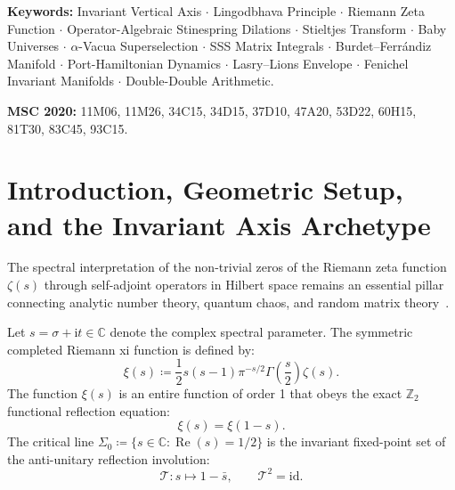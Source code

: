 \documentclass[11pt,a4paper,reqno]{article}
\theoremstyle{plain}
\theoremstyle{definition}
\theoremstyle{remark}
\numberwithin{equation}{section}
\begin{document}
\vspace{0.8ex}
\noindent\textbf{Keywords:} Invariant Vertical Axis $\cdot$ Lingodbhava Principle $\cdot$ Riemann Zeta Function $\cdot$ Operator-Algebraic Stinespring Dilations $\cdot$ Stieltjes Transform $\cdot$ Baby Universes $\cdot$ $\alpha$-Vacua Superselection $\cdot$ SSS Matrix Integrals $\cdot$ Burdet--Ferr\'{a}ndiz Manifold $\cdot$ Port-Hamiltonian Dynamics $\cdot$ Lasry--Lions Envelope $\cdot$ Fenichel Invariant Manifolds $\cdot$ Double-Double Arithmetic.

\vspace{0.4ex}
\noindent\textbf{MSC 2020:} 11M06, 11M26, 34C15, 34D15, 37D10, 47A20, 53D22, 60H15, 81T30, 83C45, 93C15.

\clearpage
\tableofcontents
\clearpage

\section{Introduction, Geometric Setup, and the Invariant Axis Archetype}
\label{sec:introduction}

The spectral interpretation of the non-trivial zeros of the Riemann zeta function $\zeta(s)$ through self-adjoint operators in Hilbert space remains an essential pillar connecting analytic number theory, quantum chaos, and random matrix theory~\cite{BerryKeating1999, Connes1999}. 

Let $s = \sigma + \mathrm{i}t \in \mathbb{C}$ denote the complex spectral parameter. The symmetric completed Riemann xi function is defined by:
\begin{equation}
  \xi(s) \coloneqq \frac{1}{2} s (s - 1) \pi^{-s/2} \Gamma\left(\frac{s}{2}\right) \zeta(s).
  \label{eq:xi_def}
\end{equation}
The function $\xi(s)$ is an entire function of order 1 that obeys the exact $\mathbb{Z}_2$ functional reflection equation:
\begin{equation}
  \xi(s) = \xi(1 - s).
  \label{eq:xi_reflection}
\end{equation}
The critical line $\Sigma_0 \coloneqq \{s \in \mathbb{C} : \operatorname{Re}(s) = 1/2\}$ is the invariant fixed-point set of the anti-unitary reflection involution:
\begin{equation}
  \mathcal{T} : s \mapsto 1 - \bar{s}, \qquad \mathcal{T}^2 = \mathrm{id}.
  \label{eq:involution_T}
\end{equation}
\end{document}
